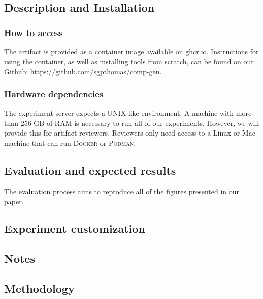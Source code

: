 \documentclass{sigplanconf}
\begin{document}
\subsection{Description and Installation}

\subsubsection{How to access}

The artifact is provided as a container image available on \url{ghcr.io}. Instructions for using the container, as well as installing tools from scratch, can be found on our Github: \url{https://github.com/sgpthomas/comp-gen}.

\subsubsection{Hardware dependencies}

The experiment server expects a UNIX-like environment. A machine with more than 256 GB of RAM is necessary to run all of our experiments. However, we will provide this for artifact reviewers. Reviewers only need access to a Linux or Mac machine that can run \textsc{Docker} or \textsc{Podman}.


\subsection{Evaluation and expected results}

The evaluation process aims to reproduce all of the figures presented in our paper.

\subsection{Experiment customization}

\subsection{Notes}

\subsection{Methodology}
\end{document}
